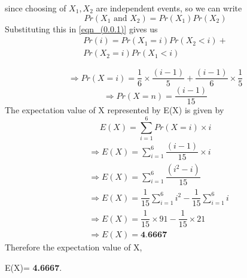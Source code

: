 \documentclass[a4paper]{article}
\begin{document}
\begin{multicols*}{2}
since choosing of $X_1,X_2$ are independent events, so we can write 
$$Pr(X_1 \text{ and }X_2)=Pr(X_1)Pr(X_2)$$
Substituting this in \eqref{eqn_(0.0.1)} gives us
\begin{multline}
Pr(i)=Pr(X_1=i)Pr(X_2<i)+\\
Pr(X_2=i)Pr(X_1<i)
\end{multline}

$$\Longrightarrow Pr(X=i)=\dfrac{1}{6}\times \dfrac{(i-1)}{5}+\dfrac{(i-1)}{6} \times\dfrac{1}{5}$$
$$\Longrightarrow Pr(X=n)=\dfrac{(i-1)}{15}$$
The expectation value of X represented by E(X) is given by
$$E(X)=\sum_{i=1}^{6} Pr(X=i)\times i$$
\begin{align}
& \Longrightarrow E(X)=\sum_{i=1}^{6} \dfrac{(i-1)}{15}\times i\\
& \Longrightarrow E(X)=\sum_{i=1}^{6} \dfrac{(i^2-i)}{15}\\
& \Longrightarrow E(X)=\dfrac{1}{15} \sum_{i=1}^{6} i^2-\dfrac{1}{15}\sum_{i=1}^{6} i\\
& \Longrightarrow E(X)=\dfrac{1}{15} \times 91-\dfrac{1}{15} \times 21\\
& \Longrightarrow E(X)= \textbf{4.6667}
\end{align}
Therefore the expectation value of X, 

E(X)= \textbf{4.6667}.
\end{multicols*}
\end{document}
